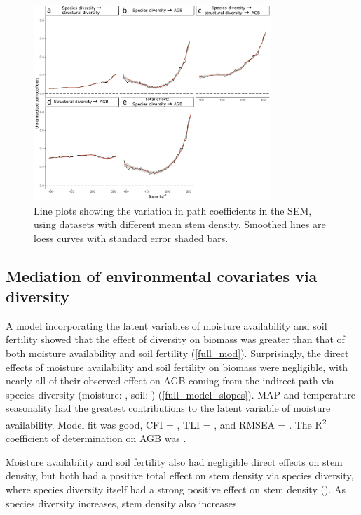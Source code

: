 \documentclass[11pt,a4paper]{article}
\begin{document}
\begin{figure}[H]
\centering
	\includegraphics[width=0.8\textwidth]{sem_struc_stems_ha}
	\caption{Line plots showing the variation in path coefficients in the SEM, using datasets with different mean stem density. Smoothed lines are loess curves with standard error shaded bars.}
	\label{sem_struc_stems_ha}
\end{figure}

\subsection{Mediation of environmental covariates via diversity}

A model incorporating the latent variables of moisture availability and soil fertility showed that the effect of diversity on biomass was greater than that of both moisture availability and soil fertility (\autoref{full_mod}). Surprisingly, the direct effects of moisture availability and soil fertility on biomass were negligible, with nearly all of their observed effect on AGB coming from the indirect path via species diversity (moisture: \rgmbd{}, soil: \rgsbd{}) (\autoref{full_model_slopes}). MAP and temperature seasonality had the greatest contributions to the latent variable of moisture availability. Model fit was good, CFI = \fmcfi{}, TLI = \fmtli{}, and RMSEA = \fmrmsea{}. The R\textsuperscript{2} coefficient of determination on AGB was \fmrsq{}.

Moisture availability and soil fertility also had negligible direct effects on stem density, but both had a positive total effect on stem density via species diversity, where species diversity itself had a strong positive effect on stem density (\rgid{}). As species diversity increases, stem density also increases. 
\end{document}
